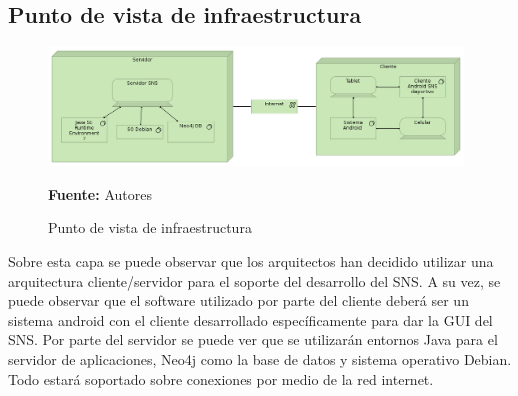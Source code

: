 \subsection{Punto de vista de infraestructura}

\begin{figure}[!htb]
  \begin{center}
    \includegraphics[width=11cm]{./imagenes/Archimate/vistas/generales/infrastructure.png}
    \caption{Punto de vista de infraestructura}
    \label{fig:infrastructure}
    \textbf{Fuente:}  Autores
  \end{center}
\end{figure}

Sobre esta capa se puede observar que los arquitectos han decidido utilizar una arquitectura cliente/servidor para el soporte del desarrollo del SNS. A su vez, se puede observar que el software utilizado por parte del cliente deberá ser un sistema android con el cliente desarrollado específicamente para dar la GUI del SNS. Por parte del servidor se puede ver que se utilizarán entornos Java para el servidor de aplicaciones, Neo4j como la base de datos y sistema operativo Debian. Todo estará soportado sobre conexiones por medio de la red internet.
